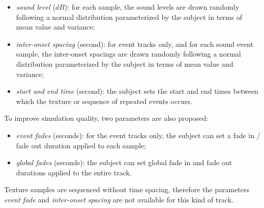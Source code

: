 \documentclass[12pt]{elsarticle}
\begin{document}
\begin{itemize}
\item \emph{sound level} ($dB$): for each sample, the sound levels are drawn randomly following a normal distribution parameterized by the subject in terms of mean value and variance;
\item \emph{inter-onset spacing} (second): for event tracks only, and for each sound event sample, the inter-onset spacings are drawn randomly following a normal distribution parameterized by the subject in terms of mean value and variance;
\item \emph{start and end time} (second): the subject sets the start and end times between which the texture or sequence of repeated events occurs.
\end{itemize}


To improve simulation quality, two parameters are also proposed:


\begin{itemize}
\item \emph{event fades} (seconds): for the event tracks only, the subject can set a fade in / fade out duration applied to each sample;
\item \emph{global fades} (seconds): the subject can set global fade in and fade out durations applied to the entire track.
\end{itemize}


Texture samples are sequenced without time spacing, therefore the parameters \emph{event fade} and \emph{inter-onset spacing} are not available for this kind of track.

\end{document}
